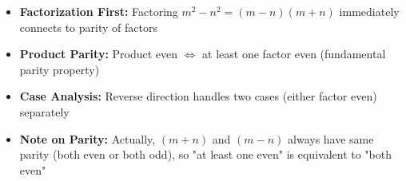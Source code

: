 \begin{takeaways}
\begin{itemize}
\item \textbf{Factorization First:} Factoring $m^2 - n^2 = (m-n)(m+n)$ immediately connects to parity of factors
\item \textbf{Product Parity:} Product even $\iff$ at least one factor even (fundamental parity property)
\item \textbf{Case Analysis:} Reverse direction handles two cases (either factor even) separately
\item \textbf{Note on Parity:} Actually, $(m+n)$ and $(m-n)$ always have same parity (both even or both odd), so "at least one even" is equivalent to "both even"
\end{itemize}
\end{takeaways}
